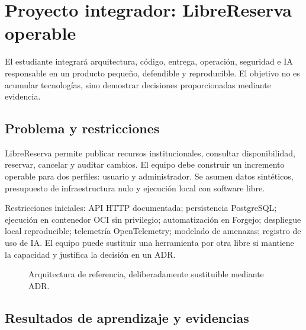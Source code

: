 \chapter{Proyecto integrador: LibreReserva operable}
\label{chap:proyecto}

\begin{objetivos}
El estudiante integrará arquitectura, código, entrega, operación, seguridad e IA responsable en un producto pequeño, defendible y reproducible. El objetivo no es acumular tecnologías, sino demostrar decisiones proporcionadas mediante evidencia.
\end{objetivos}

\section{Problema y restricciones}

LibreReserva permite publicar recursos institucionales, consultar disponibilidad, reservar, cancelar y auditar cambios. El equipo debe construir un incremento operable para dos perfiles: usuario y administrador. Se asumen datos sintéticos, presupuesto de infraestructura nulo y ejecución local con software libre.

Restricciones iniciales: API HTTP documentada; persistencia PostgreSQL; ejecución en contenedor OCI sin privilegio; automatización en Forgejo; despliegue local reproducible; telemetría OpenTelemetry; modelado de amenazas; registro de uso de IA. El equipo puede sustituir una herramienta por otra libre si mantiene la capacidad y justifica la decisión en un ADR.

\begin{figure}[htbp]
\centering
{}
\caption{Arquitectura de referencia, deliberadamente sustituible mediante ADR.}
\end{figure}

\section{Resultados de aprendizaje y evidencias}

